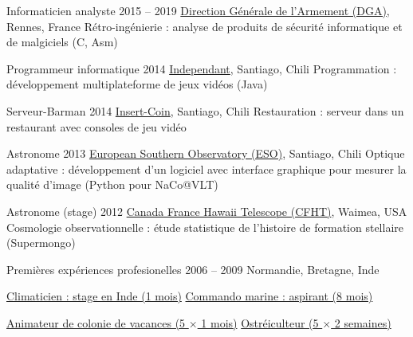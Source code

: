 \begin{joblist}[12.8][8.4][4]

\setlength{\parskip}{0.1cm}
\vspace{-0.4cm}

\item[Informaticien analyste]{2015 -- 2019}
	{
  \href{http://www.defense.gouv.fr/dga/}{Direction Générale de l'Armement (DGA)}, Rennes, France
  }
  {Rétro-ingénierie : analyse de produits de sécurité informatique et de malgiciels (C, Asm)}

\item[Programmeur informatique]{2014}
	{
	\href{https://tinmarino.github.io/Page/}{Independant}, Santiago, Chili
  }
  {Programmation : développement multiplateforme de jeux vidéos (Java)}


\item[Serveur-Barman]{2014}
	{
	\href{http://www.insertcoin.cl/}{Insert-Coin}, Santiago, Chili
  }
	{Restauration : serveur dans un restaurant avec consoles de jeu vidéo}


\item[Astronome]{2013}
	{
	\href{http://www.eso.org/public/}{European Southern Observatory (ESO)}, Santiago, Chili
	}
  {Optique adaptative : développement d'un logiciel avec interface graphique pour mesurer la qualité d'image (Python pour NaCo@VLT)}

\item[Astronome (stage)]{2012}
	{
\href{https://www.cfht.hawaii.edu/}{Canada France Hawaii Telescope (CFHT)}, Waimea, USA
  }
  {Cosmologie observationnelle : étude statistique de l'histoire de formation stellaire (Supermongo)}

\item[Premières expériences profesionelles]{2006 -- 2009}
	{
	Normandie, Bretagne, Inde
	}
	{
    \renewcommand\labelitemi{{}}
		\vspace{-0.8cm}
    \setlength{\parskip}{0cm}
		\begin{itemize}
		\setlength\itemsep{0cm}
    \cvitem \href{http://www.dupont.co.in/}{ Climaticien : stage en Inde (1 mois)}
    \cvitem \href{http://www.defense.gouv.fr/marine/organisation/forces/fusiliers-marins-et-commandos/force-maritime-des-fusiliers-marins-et-commandos}{ Commando marine : aspirant (8 mois)}
	
    \cvitem \href{http://www.vacances-pour-tous.org/}{ Animateur de colonie de vacances (5 $\times$ 1 mois)}
    \cvitem \href{http://huitresdesaintvaast.fr/}{ Ostréiculteur (5 $\times$ 2 semaines)}
		\end{itemize}
  }
\end{joblist}



